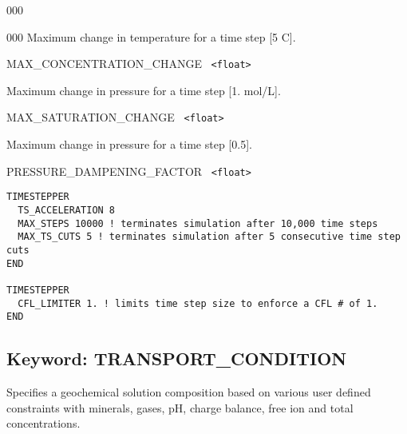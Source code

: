 \begin{deflist}{000}
\begin{deflist}{000}
Maximum change in temperature for a time step [5 C].

\item[MAX\_CONCENTRATION\_CHANGE] \ {\tt <float>} 

Maximum change in pressure for a time step [1. mol/L].

\item[MAX\_SATURATION\_CHANGE] \ {\tt <float>} 

Maximum change in pressure for a time step [0.5].

\item[PRESSURE\_DAMPENING\_FACTOR] \ {\tt <float>}
\end{deflist}
\item[\keyend]
\end{deflist}


\newpage
{}

\begin{mdframed}
\footnotesize
\begin{Verbatim}
TIMESTEPPER
  TS_ACCELERATION 8
  MAX_STEPS 10000 ! terminates simulation after 10,000 time steps
  MAX_TS_CUTS 5 ! terminates simulation after 5 consecutive time step cuts
END

TIMESTEPPER
  CFL_LIMITER 1. ! limits time step size to enforce a CFL # of 1.
END
\end{Verbatim}
\normalsize
\end{mdframed}

\hyperlink{target_key}{\return}


\newpage
\protect\hypertarget{target_trans_cond}{}

\subsection{Keyword: TRANSPORT\_CONDITION}

 Specifies a geochemical solution composition based on various user defined constraints with minerals, gases, pH, charge balance, free ion and total concentrations.


